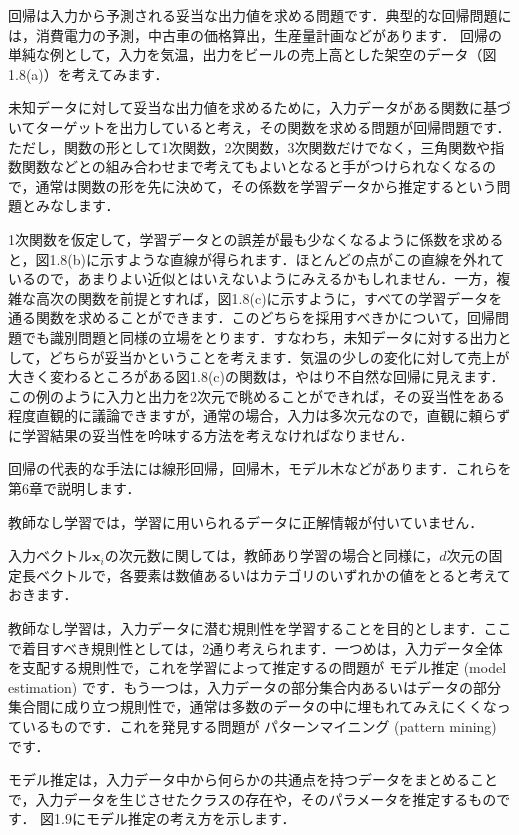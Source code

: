 
回帰は入力から予測される妥当な出力値を求める問題です．典型的な回帰問題には，消費電力の予測，中古車の価格算出，生産量計画などがあります．
回帰の単純な例として，入力を気温，出力をビールの売上高とした架空のデータ（図1.8(a)）を考えてみます．

未知データに対して妥当な出力値を求めるために，入力データがある関数に基づいてターゲットを出力していると考え，その関数を求める問題が回帰問題です．ただし，関数の形として1次関数，2次関数，3次関数だけでなく，三角関数や指数関数などとの組み合わせまで考えてもよいとなると手がつけられなくなるので，通常は関数の形を先に決めて，その係数を学習データから推定するという問題とみなします．

1次関数を仮定して，学習データとの誤差が最も少なくなるように係数を求めると，図1.8(b)に示すような直線が得られます．ほとんどの点がこの直線を外れているので，あまりよい近似とはいえないようにみえるかもしれません．一方，複雑な高次の関数を前提とすれば，図1.8(c)に示すように，すべての学習データを通る関数を求めることができます．このどちらを採用すべきかについて，回帰問題でも識別問題と同様の立場をとります．すなわち，未知データに対する出力として，どちらが妥当かということを考えます．気温の少しの変化に対して売上が大きく変わるところがある図1.8(c)の関数は，やはり不自然な回帰に見えます．この例のように入力と出力を2次元で眺めることができれば，その妥当性をある程度直観的に議論できますが，通常の場合，入力は多次元なので，直観に頼らずに学習結果の妥当性を吟味する方法を考えなければなりません．

回帰の代表的な手法には線形回帰，回帰木，モデル木などがあります．これらを第6章で説明します．


教師なし学習では，学習に用いられるデータに正解情報が付いていません．

入力ベクトル$\bm{x}_i$の次元数に関しては，教師あり学習の場合と同様に，$d$次元の固定長ベクトルで，各要素は数値あるいはカテゴリのいずれかの値をとると考えておきます．

教師なし学習は，入力データに潜む規則性を学習することを目的とします．ここで着目すべき規則性としては，2通り考えられます．一つめは，入力データ全体を支配する規則性で，これを学習によって推定するの問題が
モデル推定 (model estimation)
です．もう一つは，入力データの部分集合内あるいはデータの部分集合間に成り立つ規則性で，通常は多数のデータの中に埋もれてみえにくくなっているものです．これを発見する問題が
パターンマイニング (pattern mining) 
です．


モデル推定は，入力データ中から何らかの共通点を持つデータをまとめることで，入力データを生じさせたクラスの存在や，そのパラメータを推定するものです．
図1.9にモデル推定の考え方を示します．

